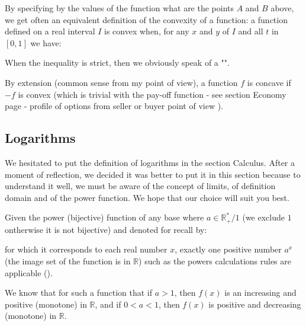 	By specifying by the values of the function what are the points $A$ and $B$ above, we get often an equivalent definition of the convexity of a function: a function defined on a real interval $I$ is convex when, for any $x$ and $y$ of $I$ and all $t$ in $[0,1]$ we have:
	
	When the inequality is strict, then we obviously speak of a "".

	By extension (common sense from my point of view), a function $f$ is concave if $-f$ is convex (which is trivial with the pay-off function - see section Economy page \pageref{finance convex function} - profile of options from seller or buyer point of view ).
			
	\pagebreak
	\subsection{Logarithms}\label{logarithms}
	We hesitated to put the definition of logarithms in the section Calculus. After a moment of reflection, we decided it was better to put it in this section because to understand it well, we must be aware of the concept of limits, of definition domain and of the power function. We hope that our choice will suit you best.
	
	Given the power (bijective) function of any base where $a \in \mathbb{R}_{+}^{*}/1$ (we exclude $1$ ontherwise it is not bijective) and denoted for recall by:
	
	for which it corresponds to each real number $x$, exactly one positive number $a^x$ (the image set of the function is in $\mathbb{R}$) such as the powers calculations rules are applicable ().
	
	We know that for such a function that if $a>1$, then $f (x)$ is an increasing and positive (monotone) in $\mathbb{R}$, and if $0<a<1$, then $f(x)$ is positive and decreasing (monotone) in $\mathbb{R}$.
	
